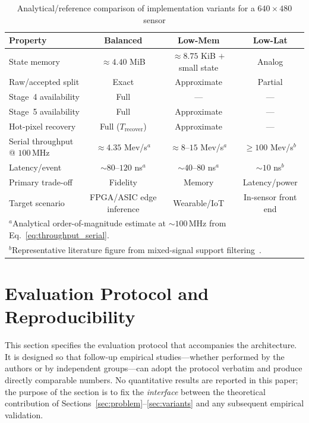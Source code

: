 \documentclass[a4paper,fleqn]{cas-dc}
\begin{document}
\begin{table}[t]
\centering
\caption{Analytical/reference comparison of implementation variants for a $640\times480$ sensor}
\label{tab:variants}
\begin{tabular}{lccc}
\toprule
\textbf{Property} & \textbf{Balanced} & \textbf{Low-Mem} & \textbf{Low-Lat} \\
\midrule
State memory & $\approx 4.40$ MiB & $\approx 8.75$ KiB $+$ small state & Analog \\
Raw/accepted split & Exact & Approximate & Partial \\
Stage~4 availability & Full & --- & --- \\
Stage~5 availability & Full & Approximate & --- \\
Hot-pixel recovery & Full ($T_{\text{recover}}$) & Approximate & --- \\
Serial throughput @ $100$\,MHz & $\approx 4.35$ Mev/s$^a$ & $\approx 8$--$15$ Mev/s$^a$ & $\geq 100$ Mev/s$^b$ \\
Latency/event & $\sim 80$--$120$ ns$^a$ & $\sim 40$--$80$ ns$^a$ & $\sim 10$ ns$^b$ \\
Primary trade-off & Fidelity & Memory & Latency/power \\
Target scenario & FPGA/ASIC edge inference & Wearable/IoT & In-sensor front end \\
\bottomrule
\multicolumn{4}{l}{\footnotesize $^a$Analytical order-of-magnitude estimate at $\sim100$\,MHz from Eq.~\eqref{eq:throughput_serial}.} \\
\multicolumn{4}{l}{\footnotesize $^b$Representative literature figure from mixed-signal support filtering~\citep{liu2019mixed}.}
\end{tabular}
\end{table}

\section{Evaluation Protocol and Reproducibility}
\label{sec:evaluation}

This section specifies the evaluation protocol that accompanies the architecture. It is designed so that follow-up empirical studies---whether performed by the authors or by independent groups---can adopt the protocol verbatim and produce directly comparable numbers. No quantitative results are reported in this paper; the purpose of the section is to fix the \emph{interface} between the theoretical contribution of Sections~\ref{sec:problem}--\ref{sec:variants} and any subsequent empirical validation.
\end{document}
